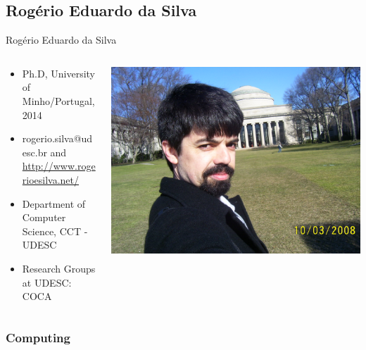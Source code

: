 \documentclass{beamer}
\begin{document}
\subsection{Rogério Eduardo da Silva}
\begin{frame}{Rogério Eduardo da Silva}


\begin{columns}
\begin{column}{0.5\textwidth} 
\begin{itemize}
  \item Ph.D, University of Minho/Portugal, 2014
  \item rogerio.silva@udesc.br and \url{http://www.rogerioesilva.net/}
  \item Department of Computer Science, CCT - UDESC
  \item Research Groups at UDESC: COCA 
\end{itemize}
 \end{column}

   \begin{column}{0.5\textwidth}  %
  \begin{flushright}
   \includegraphics[scale=0.15,keepaspectratio]{images/mit-roger.jpg} 
  \end{flushright} 
   \end{column} %
 \end{columns}


\end{frame}


\subsubsection{Computing}
\end{document}
